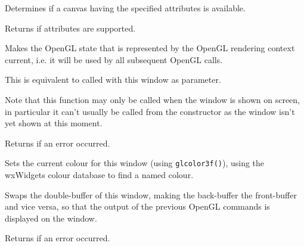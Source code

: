 
Determines if a canvas having the specified attributes is available.


Returns \true if attributes are supported.


\label{wxglcanvassetcurrent}


Makes the OpenGL state that is represented by the OpenGL rendering context
 current, i.e. it will be used by all subsequent OpenGL calls.

This is equivalent to  
called with this window as parameter.

Note that this function may only be called when the window is shown on screen,
in particular it can't usually be called from the constructor as the window
isn't yet shown at this moment.

Returns \false if an error occurred.


\label{wxglcanvassetcolour}


Sets the current colour for this window (using \texttt{glcolor3f()}), using the
wxWidgets colour database to find a named colour.


\label{wxglcanvasswapbuffers}


Swaps the double-buffer of this window, making the back-buffer the front-buffer and vice versa,
so that the output of the previous OpenGL commands is displayed on the window.

Returns \false if an error occurred.

